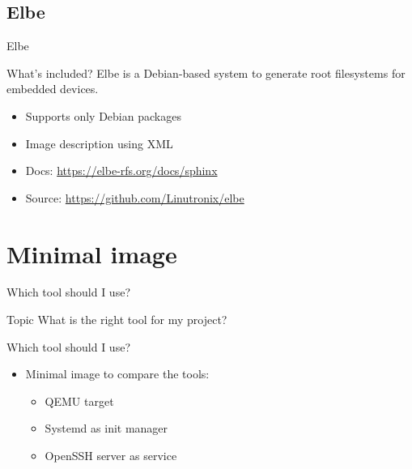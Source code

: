 \documentclass{beamer}
\begin{document}
\subsection{Elbe}

\begin{frame}{Elbe}
	\begin{block}{What's included?} 
		Elbe is a Debian-based system to generate root filesystems for embedded devices.
	\end{block}

	\begin{itemize}
		\item Supports only Debian packages
		\item Image description using XML
		\item Docs: \url{https://elbe-rfs.org/docs/sphinx}
		\item Source: \url{https://github.com/Linutronix/elbe}
	\end{itemize}
\end{frame}

\section{Minimal image}

\begin{frame}{Which tool should I use?}
	\begin{block}{Topic}
		What is the right tool for my project?
	\end{block}
\end{frame}

\begin{frame}{Which tool should I use?}
	\begin{itemize}
		\item Minimal image to compare the tools:
		\begin{itemize}
			\item QEMU target
			\item Systemd as init manager
			\item OpenSSH server as service
		\end{itemize}
	\end{itemize}
\end{frame}
\end{document}
